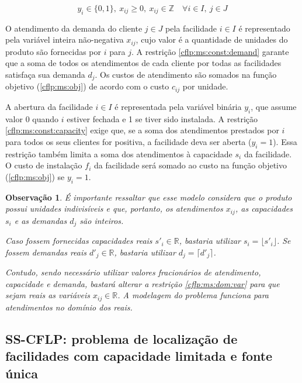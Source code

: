 \documentclass[]{article}
\newtheorem{observation}{Observação}
\begin{document}
			\begin{equation}
				\label{cflp:ms:dom:var}		
				y_i \in \{0, 1\}, 
				\ x_{ij} \ge 0, 
				\ x_{ij} \in \mathbb{Z}
				\quad
				\forall i \in I, \ j \in J
			\end{equation}
		
			O atendimento da demanda do cliente $j \in J$ pela facilidade $i \in I$ é representado pela variável inteira não-negativa $x_{ij}$, cujo valor é a quantidade de unidades do produto são fornecidas por $i$ para $j$.
			A restrição \ref{cflp:ms:const:demand} garante que a soma de todos os atendimentos de cada cliente por todas as facilidades satisfaça sua demanda $d_j$.
			Os custos de atendimento são somados na função objetivo (\ref{cflp:ms:obj}) de acordo com o custo $c_{ij}$ por unidade. 		
			
			A abertura da facilidade $i \in I$ é representada pela variável binária $y_i$, que assume valor 0 quando $i$ estiver fechada e 1 se tiver sido instalada.
			A restrição \ref{cflp:ms:const:capacity} exige que, se a soma dos atendimentos prestados por $i$ para todos os seus clientes for positiva, a facilidade deva ser aberta ($y_i = 1$). 
			Essa restrição também limita a soma dos atendimentos à capacidade $s_i$ da facilidade.
			O custo de instalação $f_i$ da facilidade será somado ao custo na função objetivo (\ref{cflp:ms:obj}) se $y_i = 1$.  
	 
	 		\begin{observation} \label{cflp:ms:obs:int}
	 			É importante ressaltar que esse modelo considera que o produto possui unidades indivisíveis e que, portanto, os atendimentos $x_{ij}$, as capacidades $s_i$ e as demandas $d_j$ são inteiros. 
	 			
	 			Caso fossem fornecidas capacidades reais $s'_i \in \mathbb{R}$, bastaria utilizar $s_i = \lfloor s'_i \rfloor$. 
	 			Se fossem demandas reais $d'_j \in \mathbb{R}$, bastaria utilizar $d_j = \lceil d'_j \rceil$. 
	 			
	 			Contudo, sendo necessário utilizar valores fracionários de atendimento, capacidade e demanda, bastará alterar a restrição \ref{cflp:ms:dom:var} para que sejam reais as variáveis $x_{ij} \in \mathbb{R}$. 
	 			A modelagem do problema funciona para atendimentos no domínio dos reais. 
	 		\end{observation} 		 			
	 		
	 	\subsection{SS-CFLP: problema de localização de facilidades com capacidade limitada e fonte única} \label{defmodel:cflp:ss}		
	 		
\end{document}
